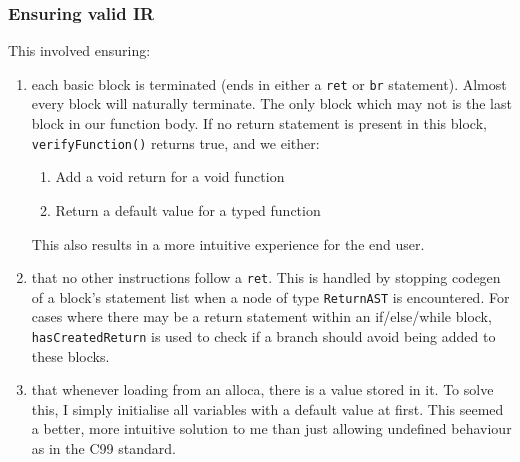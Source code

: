 \documentclass[10pt,a4paper]{article}
\newcommand{\code}[1]{\lstinline!#1!}
\begin{document}
\subsubsection*{Ensuring valid IR}
This involved ensuring:
\begin{enumerate}
    \item each basic block is terminated (ends in either a \code{ret} or \code{br} statement). Almost every block will naturally terminate. The only block which may not is the last block in our function body. If no return statement is present in this block, \code{verifyFunction()} returns true, and we either:
    \begin{enumerate}
        \item Add a void return for a void function
        \item Return a default value for a typed function
    \end{enumerate}
    This also results in a more intuitive experience for the end user.

    \item that no other instructions follow a \code{ret}. This is handled by stopping codegen of a block's statement list when a node of type \code{ReturnAST} is encountered. For cases where there may be a return statement within an if/else/while block, \code{hasCreatedReturn} is used to check if a branch should avoid being added to these blocks.
    \item that whenever loading from an alloca, there is a value stored in it. To solve this, I simply initialise all variables with a default value at first. This seemed a better, more intuitive solution to me than just allowing undefined behaviour as in the C99 standard.
\end{enumerate}
\end{document}
